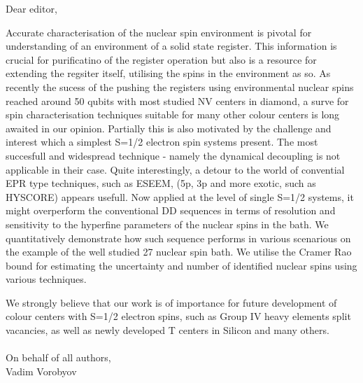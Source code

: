 \documentclass[12pt]{amsart}
\begin{document}
Dear editor,

Accurate characterisation of the nuclear spin environment is pivotal for understanding of an environment of a solid state register. 
This information is crucial for purificatino of the register operation but also is a resource for extending the regsiter itself, utilising the spins in the environment as so. 
As recently the sucess of the pushing the registers using environmental nuclear spins reached around 50 qubits with most studied NV centers in diamond, a surve for spin characterisation techniques suitable for many other colour centers is long awaited in our opinion. 
Partially this is also motivated by the challenge and interest which a simplest S=1/2 electron spin systems present. 
The most succesfull and widespread technique - namely the dynamical decoupling is not applicable in their case. 
Quite interestingly, a detour to the world of convential EPR type techniques, such as ESEEM, (5p, 3p and more exotic, such as HYSCORE) appears usefull. 
Now applied at the level of single S=1/2 systems, it might overperform the conventional DD sequences in terms of resolution and sensitivity to the hyperfine parameters of the nuclear spins in the bath.  
We quantitatively demonstrate how such sequence performs in various scenarious on the example of the well studied 27 nuclear spin bath.
We utilise the Cramer Rao bound for estimating the uncertainty and number of identified nuclear spins using various techniques. 

We strongly believe that our work is of importance for future development of colour centers with S=1/2 electron spins, such as Group IV heavy elements split vacancies, as well as newly developed T centers in Silicon and many others. 
\\
\\
On behalf of all authors, \\
Vadim Vorobyov
\end{document}
